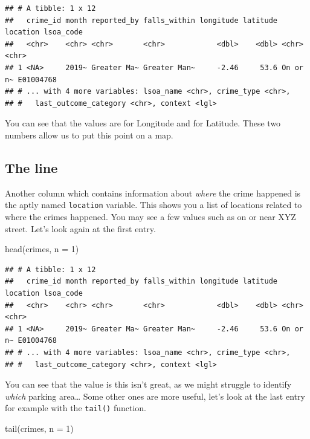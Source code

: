 \documentclass[
]{book}
\newenvironment{Shaded}{\begin{snugshade}}{\end{snugshade}}
\newcommand{\AttributeTok}[1]{\textcolor[rgb]{0.77,0.63,0.00}{#1}}
\newcommand{\DecValTok}[1]{\textcolor[rgb]{0.00,0.00,0.81}{#1}}
\newcommand{\FunctionTok}[1]{\textcolor[rgb]{0.00,0.00,0.00}{#1}}
\newcommand{\NormalTok}[1]{#1}
\begin{document}
\begin{verbatim}
## # A tibble: 1 x 12
##   crime_id month reported_by falls_within longitude latitude location lsoa_code
##   <chr>    <chr> <chr>       <chr>            <dbl>    <dbl> <chr>    <chr>    
## 1 <NA>     2019~ Greater Ma~ Greater Man~     -2.46     53.6 On or n~ E01004768
## # ... with 4 more variables: lsoa_name <chr>, crime_type <chr>,
## #   last_outcome_category <chr>, context <lgl>
\end{verbatim}

You can see that the values are for Longitude and for Latitude. These two numbers allow us to put this point on a map.

\hypertarget{the-line}{%
\subsection{The line}\label{the-line}}

Another column which contains information about \emph{where} the crime happened is the aptly named \texttt{location} variable. This shows you a list of locations related to where the crimes happened. You may see a few values such as on or near XYZ street. Let's look again at the first entry.

\begin{Shaded}
\begin{Highlighting}[]
\FunctionTok{head}\NormalTok{(crimes, }\AttributeTok{n =} \DecValTok{1}\NormalTok{)}
\end{Highlighting}
\end{Shaded}

\begin{verbatim}
## # A tibble: 1 x 12
##   crime_id month reported_by falls_within longitude latitude location lsoa_code
##   <chr>    <chr> <chr>       <chr>            <dbl>    <dbl> <chr>    <chr>    
## 1 <NA>     2019~ Greater Ma~ Greater Man~     -2.46     53.6 On or n~ E01004768
## # ... with 4 more variables: lsoa_name <chr>, crime_type <chr>,
## #   last_outcome_category <chr>, context <lgl>
\end{verbatim}

You can see that the value is this isn't great, as we might struggle to identify \emph{which} parking area\ldots{} Some other ones are more useful, let's look at the last entry for example with the \texttt{tail()} function.

\begin{Shaded}
\begin{Highlighting}[]
\FunctionTok{tail}\NormalTok{(crimes, }\AttributeTok{n =} \DecValTok{1}\NormalTok{)}
\end{Highlighting}
\end{Shaded}
\end{document}
